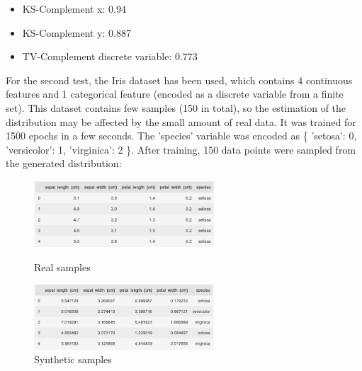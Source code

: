 \begin{itemize}
    \item KS-Complement x: 0.94
    \item KS-Complement y: 0.887
    \item TV-Complement discrete variable: 0.773
\end{itemize}

For the second test, the Iris dataset has been used, which contains 4 continuous features and 1 categorical feature (encoded as a discrete variable from a finite set). This dataset contains few samples (150 in total), so the estimation of the distribution may be affected by the small amount of real data. It was trained for 1500 epochs in a few seconds. The 'species' variable was encoded as \{ 'setosa': 0, 'versicolor': 1, 'virginica': 2 \}. After training, 150 data points were sampled from the generated distribution:\\

\begin{figure}[htbp]
    \centering
    \begin{minipage}[b]{0.4\textwidth}
      \centering
      \includegraphics[width=0.6\textwidth]{figures/4-Advanced_Strategies/Ejemplo_Dataset_2_Real.png}
      \caption{Real samples}
    \end{minipage}
    \hfill
    \begin{minipage}[b]{0.4\textwidth}
      \centering
      \includegraphics[width=0.6\textwidth]{figures/4-Advanced_Strategies/Ejemplo_Dataset_2_Sintetico.png}
      \caption{Synthetic samples}
    \end{minipage}
\end{figure}

